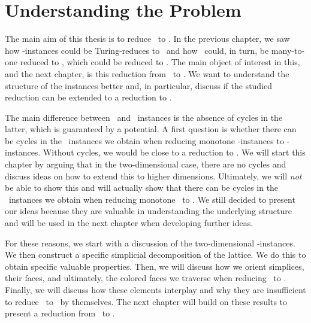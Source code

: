 \setchapterpreamble[u]{\margintoc}
\chapter{Understanding the Problem}\label{ch:understanding_the_problem}

The main aim of this thesis is to reduce \Tarski\ to \EndOfPotentialLine\@. In the previous chapter, we saw how \Tarski-instances could be Turing-reduces to \Tarskistar\ and how \Tarskistar\ could, in turn, be many-to-one reduced to \Sperner, which could be reduced to \EndOfLine. The main object of interest in this, and the next chapter, is this reduction from \Tarski\ to \EndOfLine. We want to understand the structure of the instances better and, in particular, discuss if the studied reduction can be extended to a reduction to \EndOfPotentialLine\@.

The main difference between \EndOfLine\ and \EndOfPotentialLine\ instances is the absence of cycles in the latter, which is guaranteed by a potential. A first question is whether there can be cycles in the \EndOfLine\ instances we obtain when reducing monotone \Tarskistar-instances to \EndOfLine-instances. Without cycles, we would be close to a reduction to \EndOfPotentialLine\@. We will start this chapter by arguing that in the two-dimensional case, there are no cycles and discuss ideas on how to extend this to higher dimensions. Ultimately, we will \emph{not} be able to show this and will actually show that there can be cycles in the \EndOfLine\ instances we obtain when reducing monotone \Tarskistar\ to \EndOfLine\@. We still decided to present our ideas because they are valuable in understanding the underlying structure and will be used in the next chapter when developing further ideas.

For these reasons, we start with a discussion of the two-dimensional \Tarskistar-instances. We then construct a specific simplicial decomposition of the lattice. We do this to obtain specific valuable properties. Then, we will discuss how we orient simplices, their faces, and ultimately, the colored faces we traverse when reducing \Sperner\ to \EndOfLine. Finally, we will discuss how these elements interplay and why they are insufficient to reduce \Tarski\ to \EndOfPotentialLine\ by themselves. The next chapter will build on these results to present a reduction from \Tarski\ to \EndOfPotentialLine\@.


